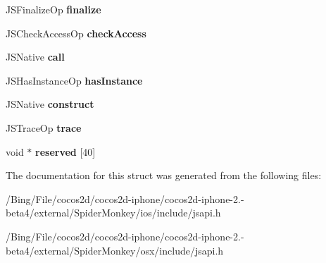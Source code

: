 \begin{DoxyCompactItemize}
\item 
\hypertarget{struct_j_s_class_a3a3b7014d8f7ce9c2c9fb8bf90e3ac77}{J\-S\-Finalize\-Op {\bfseries finalize}}\label{struct_j_s_class_a3a3b7014d8f7ce9c2c9fb8bf90e3ac77}

\item 
\hypertarget{struct_j_s_class_a50154a95bb53a68fbd0fe957bb3d61cb}{J\-S\-Check\-Access\-Op {\bfseries check\-Access}}\label{struct_j_s_class_a50154a95bb53a68fbd0fe957bb3d61cb}

\item 
\hypertarget{struct_j_s_class_a59f0da123d08c674bc84ec05ae2d679e}{J\-S\-Native {\bfseries call}}\label{struct_j_s_class_a59f0da123d08c674bc84ec05ae2d679e}

\item 
\hypertarget{struct_j_s_class_a35b4cc3410947267e8c8ffae33b48607}{J\-S\-Has\-Instance\-Op {\bfseries has\-Instance}}\label{struct_j_s_class_a35b4cc3410947267e8c8ffae33b48607}

\item 
\hypertarget{struct_j_s_class_acafb0d9a3ca392c6c0d77d52c8b7ef83}{J\-S\-Native {\bfseries construct}}\label{struct_j_s_class_acafb0d9a3ca392c6c0d77d52c8b7ef83}

\item 
\hypertarget{struct_j_s_class_a34b72e526edb4a0108ed74f961354d0b}{J\-S\-Trace\-Op {\bfseries trace}}\label{struct_j_s_class_a34b72e526edb4a0108ed74f961354d0b}

\item 
\hypertarget{struct_j_s_class_a4570a24ed7fdef44837426062c0e4d22}{void $\ast$ {\bfseries reserved} \mbox{[}40\mbox{]}}\label{struct_j_s_class_a4570a24ed7fdef44837426062c0e4d22}

\end{DoxyCompactItemize}


The documentation for this struct was generated from the following files\-:\begin{DoxyCompactItemize}
\item 
/\-Bing/\-File/cocos2d/cocos2d-\/iphone/cocos2d-\/iphone-\/2.-\/beta4/external/\-Spider\-Monkey/ios/include/jsapi.\-h\item 
/\-Bing/\-File/cocos2d/cocos2d-\/iphone/cocos2d-\/iphone-\/2.-\/beta4/external/\-Spider\-Monkey/osx/include/jsapi.\-h\end{DoxyCompactItemize}
